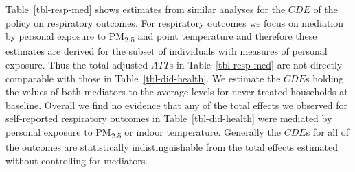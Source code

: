 \documentclass[
  letterpaper,
  DIV=11,
  numbers=noendperiod]{scrartcl}
\begin{document}
Table~\ref{tbl-resp-med} shows estimates from similar analyses for the
\(CDE\) of the policy on respiratory outcomes. For respiratory outcomes
we focus on mediation by personal exposure to PM\textsubscript{2.5} and
point temperature and therefore these estimates are derived for the
subset of individuals with measures of personal exposure. Thus the total
adjusted \(ATT\)s in Table~\ref{tbl-resp-med} are not directly
comparable with those in Table~\ref{tbl-did-health}. We estimate the
\(CDE\)s holding the values of both mediators to the average levels for
never treated households at baseline. Overall we find no evidence that
any of the total effects we observed for self-reported respiratory
outcomes in Table~\ref{tbl-did-health} were mediated by personal
exposure to PM\textsubscript{2.5} or indoor temperature. Generally the
\(CDE\)s for all of the outcomes are statistically indistinguishable
from the total effects estimated without controlling for mediators.
\end{document}
